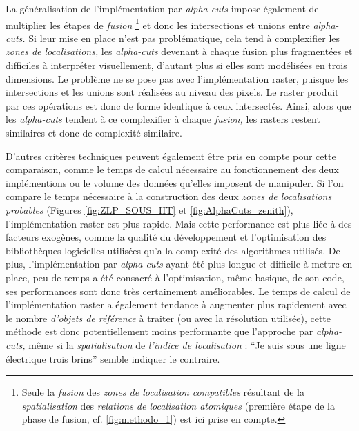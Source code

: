 La généralisation de l'implémentation par \emph{alpha-cuts} impose
également de multiplier les étapes de \emph{fusion} \footnote{Seule la
  \emph{fusion} des \emph{zones de localisation compatibles} résultant
  de la \emph{spatialisation} des \emph{relations de localisation
    atomiques} (première étape de la phase de fusion,
  cf. \autoref{fig:methodo_1}) est ici prise en compte.} et donc les
intersections et unions entre \emph{alpha-cuts.} Si leur mise en place
n'est pas problématique, cela tend à complexifier les \emph{zones de
  localisations,} les \emph{alpha-cuts} devenant à chaque fusion plus
fragmentées et difficiles à interpréter visuellement, d'autant plus si
elles sont modélisées en trois dimensions. Le problème ne se pose pas
avec l'implémentation raster, puisque les intersections et les unions
sont réalisées au niveau des pixels. Le raster produit par ces
opérations est donc de forme identique à ceux intersectés. Ainsi,
alors que les \emph{alpha-cuts} tendent à ce complexifier à chaque
\emph{fusion,} les rasters restent similaires et donc de complexité
similaire.

D'autres critères techniques peuvent également être pris en compte
pour cette comparaison, comme le temps de calcul nécessaire au
fonctionnement des deux implémentions ou le volume des données
qu'elles imposent de manipuler. Si l'on compare le temps nécessaire à
la construction des deux \emph{zones de localisations probables}
(Figures \ref{fig:ZLP_SOUS_HT} et \ref{fig:AlphaCuts_zenith}),
l'implémentation raster est plus rapide. Mais cette performance est
plus liée à des facteurs exogènes, comme la qualité du développement
et l'optimisation des bibliothèques logicielles utilisées qu'a la
complexité des algorithmes utilisés. De plus, l'implémentation par
\emph{alpha-cuts} ayant été plus longue et difficile à mettre en
place, peu de temps a été consacré à l'optimisation, même basique, de
son code, ses performances sont donc très certainement
améliorables. Le temps de calcul de l'implémentation raster a
également tendance à augmenter plus rapidement avec le nombre
\emph{d'objets de référence} à traiter (ou avec la résolution
utilisée), cette méthode est donc potentiellement moins performante
que l'approche par \emph{alpha-cuts,} même si la \emph{spatialisation}
de \emph{l'indice de localisation} : \enquote{Je suis sous une ligne
  électrique trois brins} semble indiquer le contraire.

